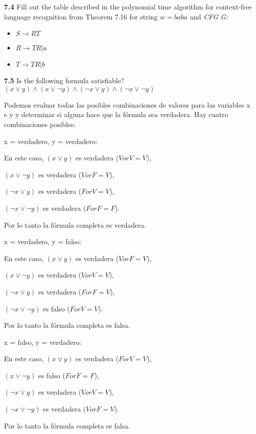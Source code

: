 \documentclass{article}
\begin{document}
\textbf{7.4} Fill out the table described in the polynomial time algorithm for
context-free language recognition from Theorem 7.16 for string $w = baba$ and
\textit{CFG G:}

\begin{itemize}
    \item $S \rightarrow RT$
    \item $R \rightarrow TR|a$
    \item $T \rightarrow TR|b$
\end{itemize}




\textbf{7.5} Is the following formula satisfiable?
$ (x \lor y) \land (x \lor \neg{y}) \land (\neg{x} \lor y) \land (\neg{x} \lor
\neg{y}) $

Podemos evaluar todas las posibles combinaciones de valores para las variables x
e y y determinar si alguna hace que la fórmula sea verdadera. Hay cuatro
combinaciones posibles:

    x = verdadero, y = verdadero:
    
    En este caso, 
    $ (x \lor y)$ es verdadera ($V or V = V$),

    $(x \lor \neg{y})$ es verdadera ($V or F = V$),

    $(\neg{x} \lor y)$ es verdadera ($F or V = V$),

    $(\neg{x} \lor \neg{y})$ es verdadera ($F or F = F$).

    Por lo tanto la fórmula completa es verdadera.

    x = verdadero, y = falso:
    
    En este caso, 
    $ (x \lor y)$ es verdadera ($V or F = V$),

    $(x \lor \neg{y})$ es verdadera ($V or V = V$),

    $(\neg{x} \lor y)$ es verdadera ($F or F = V$),

    $(\neg{x} \lor \neg{y})$ es falso ($F or V = V$).

    Por lo tanto la fórmula completa es falsa.

    x = falso, y = verdadero:
    
    En este caso, 
    $ (x \lor y)$ es verdadera ($F or V = V$),

    $(x \lor \neg{y})$ es falso ($F or F = F$),

    $(\neg{x} \lor y)$ es verdadera ($V or V = V$),

    $(\neg{x} \lor \neg{y})$ es verdadera ($V or F = V$).

    Por lo tanto la fórmula completa es falsa.
\end{document}
